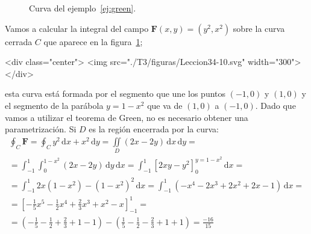 \begin{latexonly}
\begin{figure}
\begin{center}
\end{center}
\caption{Curva del ejemplo~\ref{ej:green}.}\label{fig:ej-green}
\end{figure}
\end{latexonly}
\begin{ejemplo}\label{ej:green}
Vamos a calcular la integral del campo $\boldsymbol F(x,y)=(y^2,x^2)$ sobre la curva cerrada $C$ que aparece en la figura~\ref{fig:ej-green}; 
\begin{rawhtml}
<div class="center">
<img src="./T3/figuras/Leccion34-10.svg" width="300">
</div>
\end{rawhtml}
esta curva está formada por el segmento que une los puntos $(-1,0)$ y $(1,0)$ y el segmento de la parábola $y=1-x^2$ que va de $(1,0)$ a $(-1,0)$.
Dado que vamos a utilizar el teorema de Green, no es necesario obtener una parametrización.
Si $\mathit{D}$ es la región encerrada por la curva: 
\begin{multline*}
\oint_{C} \boldsymbol{F} = 
\oint_{C} y^2\,\mathrm dx + x^2\,\mathrm dy =
\iint\limits_{\mathit D} (2x-2y)\,\mathrm dx\,\mathrm dy =\\
=\int_{-1}^1 \int_0^{1-x^2} (2x-2y)\,\mathrm dy\,\mathrm dx =
\int_{-1}^1 \left[2xy-y^2\right]_0^{y=1-x^2}\,\mathrm dx =\\
=\int_{-1}^1 2x(1-x^2)-(1-x^2)^2\,\mathrm dx =
\int_{-1}^1 (-x^4-2x^3+2x^2+2x-1)\,\mathrm dx =\\
=\left[-\frac15x^5-\frac12x^4+\frac23x^3+x^2-x\right]_{-1}^1  =\\
=(-\frac15-\frac12+\frac23+1-1)-(\frac15-\frac12-\frac23+1+1) = \frac{-16}{15}\tag*{\fej}
\end{multline*}
\end{ejemplo}

